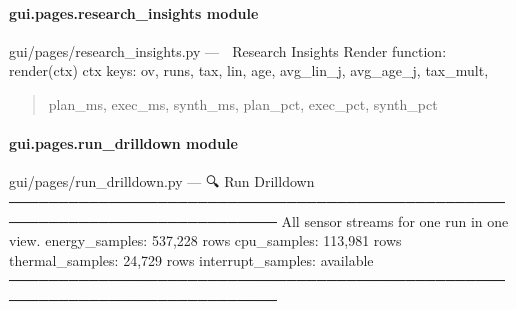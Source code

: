 \documentclass[letterpaper,10pt,english]{sphinxmanual}
\begin{document}
\paragraph{gui.pages.research\_insights module}
\label{\detokenize{gui.pages.research_insights:module-gui.pages.research_insights}}\label{\detokenize{gui.pages.research_insights:gui-pages-research-insights-module}}\label{\detokenize{gui.pages.research_insights::doc}}
\sphinxAtStartPar
gui/pages/research\_insights.py  —  🔬  Research Insights
Render function: render(ctx)
ctx keys: ov, runs, tax, lin, age, avg\_lin\_j, avg\_age\_j, tax\_mult,
\begin{quote}

\sphinxAtStartPar
plan\_ms, exec\_ms, synth\_ms, plan\_pct, exec\_pct, synth\_pct
\end{quote}

\begin{fulllineitems}
\label{\detokenize{gui.pages.research_insights:gui.pages.research_insights.render}}
\pysigstartsignatures
\pysiglinewithargsret
{}
{}
{}
\pysigstopsignatures
\end{fulllineitems}


\sphinxstepscope


\paragraph{gui.pages.run\_drilldown module}
\label{\detokenize{gui.pages.run_drilldown:module-gui.pages.run_drilldown}}\label{\detokenize{gui.pages.run_drilldown:gui-pages-run-drilldown-module}}\label{\detokenize{gui.pages.run_drilldown::doc}}
\sphinxAtStartPar
gui/pages/run\_drilldown.py  —  🔍  Run Drilldown
─────────────────────────────────────────────────────────────────────────────
All sensor streams for one run in one view.
energy\_samples: 537,228 rows
cpu\_samples:    113,981 rows
thermal\_samples: 24,729 rows
interrupt\_samples: available
─────────────────────────────────────────────────────────────────────────────
\end{document}
